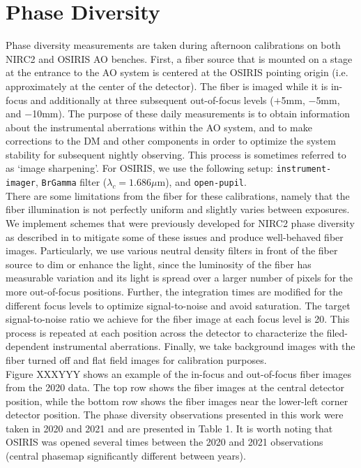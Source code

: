 \documentclass[]{spie}  %
\begin{document}
\section{Phase Diversity}\label{sec:phase_diversity}
Phase diversity measurements are taken during afternoon calibrations on both NIRC2 and OSIRIS AO benches. First, a fiber source that is mounted on a stage at the entrance to the AO system is centered at the OSIRIS pointing origin (i.e. approximately at the center of the detector). The fiber is imaged while it is in-focus and additionally at three subsequent out-of-focus levels ($+$5mm, $-$5mm, and $-$10mm). The purpose of these daily measurements is to obtain information about the instrumental aberrations within the AO system, and to make corrections to the DM and other components in order to optimize the system stability for subsequent nightly observing. This process is sometimes referred to as `image sharpening'. For OSIRIS, we use the following setup: \texttt{instrument-imager}, \texttt{BrGamma} filter ($\lambda_c = 1.686 \mu$m), and \texttt{open-pupil}.\\
\indent There are some limitations from the fiber for these calibrations, namely that the fiber illumination is not perfectly uniform and slightly varies between exposures. We implement schemes that were previously developed for NIRC2 phase diversity as described in \cite{ciurlo:2022a} to mitigate some of these issues and produce well-behaved fiber images. Particularly, we use various neutral density filters in front of the fiber source to dim or enhance the light, since the luminosity of the fiber has measurable variation and its light is spread over a larger number of pixels for the more out-of-focus positions. Further, the integration times are modified for the different focus levels to optimize signal-to-noise and avoid saturation. The target signal-to-noise ratio we achieve for the fiber image at each focus level is 20. This process is repeated at each position across the detector to characterize the filed-dependent instrumental aberrations. Finally, we take background images with the fiber turned off and flat field images for calibration purposes. \\
\indent Figure XXXYYY shows an example of the in-focus and out-of-focus fiber images from the 2020 data. The top row shows the fiber images at the central detector position, while the bottom row shows the fiber images near the lower-left corner detector position. The phase diversity observations presented in this work were taken in 2020 and 2021 and are presented in Table 1. It is worth noting that OSIRIS was opened several times between the 2020 and 2021 observations (central phasemap significantly different between years).
\end{document}
